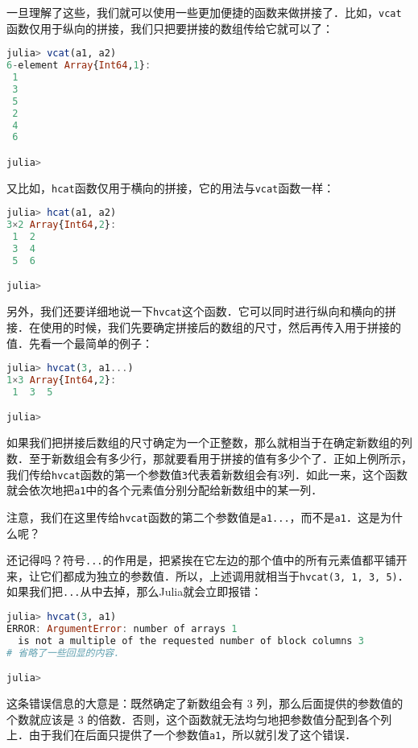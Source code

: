 一旦理解了这些，我们就可以使用一些更加便捷的函数来做拼接了．比如，\verb|vcat|函数仅用于纵向的拼接，我们只把要拼接的数组传给它就可以了：

\begin{lstlisting}[language=julia]
julia> vcat(a1, a2)
6-element Array{Int64,1}:
 1
 3
 5
 2
 4
 6

julia>
\end{lstlisting}

又比如，\verb|hcat|函数仅用于横向的拼接，它的用法与\verb|vcat|函数一样：

\begin{lstlisting}[language=julia]
julia> hcat(a1, a2)
3×2 Array{Int64,2}:
 1  2
 3  4
 5  6

julia> 
\end{lstlisting}

另外，我们还要详细地说一下\verb|hvcat|这个函数．它可以同时进行纵向和横向的拼接．在使用的时候，我们先要确定拼接后的数组的尺寸，然后再传入用于拼接的值．先看一个最简单的例子：

\begin{lstlisting}[language=julia]
julia> hvcat(3, a1...)
1×3 Array{Int64,2}:
 1  3  5

julia> 
\end{lstlisting}

如果我们把拼接后数组的尺寸确定为一个正整数，那么就相当于在确定新数组的列数．至于新数组会有多少行，那就要看用于拼接的值有多少个了．正如上例所示，我们传给\verb|hvcat|函数的第一个参数值\verb|3|代表着新数组会有3列．如此一来，这个函数就会依次地把\verb|a1|中的各个元素值分别分配给新数组中的某一列．

注意，我们在这里传给\verb|hvcat|函数的第二个参数值是\verb|a1...|，而不是\verb|a1|．这是为什么呢？

还记得吗？符号\verb|...|的作用是，把紧挨在它左边的那个值中的所有元素值都平铺开来，让它们都成为独立的参数值．所以，上述调用就相当于\verb|hvcat(3, 1, 3, 5)|．如果我们把\verb|...|从中去掉，那么Julia就会立即报错：

\begin{lstlisting}[language=julia]
julia> hvcat(3, a1)
ERROR: ArgumentError: number of arrays 1 
  is not a multiple of the requested number of block columns 3
# 省略了一些回显的内容．

julia> 
\end{lstlisting}

这条错误信息的大意是：既然确定了新数组会有 3 列，那么后面提供的参数值的个数就应该是 3 的倍数．否则，这个函数就无法均匀地把参数值分配到各个列上．由于我们在后面只提供了一个参数值\verb|a1|，所以就引发了这个错误．

